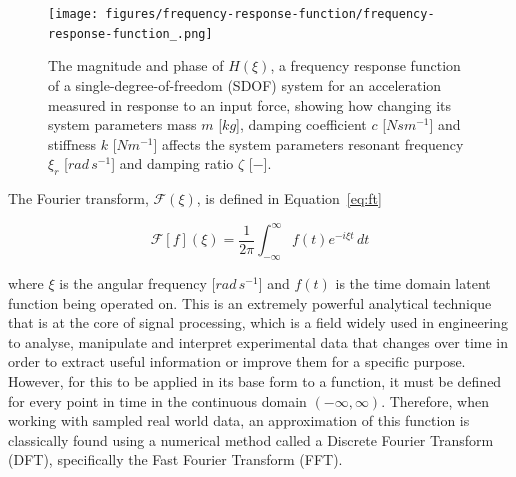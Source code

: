 \documentclass[12pt]{article}
\begin{document}
    \begin{figure}[ht]
        \centering
        \texttt{[image: figures/frequency-response-function/frequency-response-function\_.png]}
        \caption{The magnitude and phase of $H(\xi)$, a frequency response function of a single-degree-of-freedom (SDOF) system for an acceleration measured in response to an input force, showing how changing its system parameters mass $m$ [$kg$], damping coefficient $c$ [$N s m^{-1}$] and stiffness $k$ [$N m^{-1}$] affects the system parameters resonant frequency $\xi_r$ [$rad \, s^{-1}$] and damping ratio $\zeta$ [$-$].}
        \label{fig:frequency-response-function}
    \end{figure}

    The Fourier transform, $\mathcal{F}(\xi)$, is defined in Equation~\ref{eq:ft}

    \begin{equation}
        \mathcal{F}[f](\xi) = \frac{1}{2 \pi} \int_{-\infty}^{\infty} f(t) e^{-i \xi t} \, dt\label{eq:ft}
    \end{equation}


    \noindent where $\xi$ is the angular frequency [$rad \, s^{-1}$] and $f(t)$ is the time domain latent function being operated on.
    This is an extremely powerful analytical technique that is at the core of signal processing, which is a field widely used in engineering to analyse, manipulate and interpret experimental data that changes over time in order to extract useful information or improve them for a specific purpose.
    However, for this to be applied in its base form to a function, it must be defined for every point in time in the continuous domain $(-\infty, \infty)$.
    Therefore, when working with sampled real world data, an approximation of this function is classically found using a numerical method called a Discrete Fourier Transform (DFT), specifically the Fast Fourier Transform (FFT).
\end{document}
